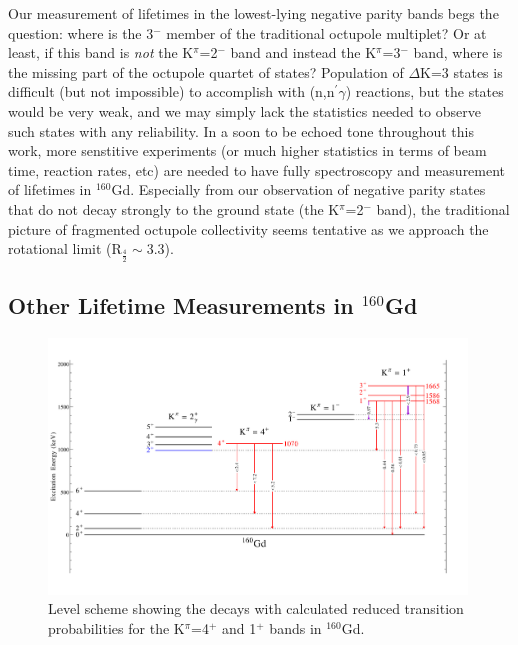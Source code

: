 Our measurement of lifetimes in the lowest-lying negative parity bands begs the question: where is the 3$^-$ member of the traditional octupole multiplet? Or at least, if this band is \textit{not} the K$^\pi$=2$^-$ band and instead the K$^\pi$=3$^-$ band, where is the missing part of the octupole quartet of states? Population of $\Delta$K=3 states is difficult (but not impossible) to accomplish with (n,n$^\prime\gamma$) reactions, but the states would be very weak, and we may simply lack the statistics needed to observe such states with any reliability. In a soon to be echoed tone throughout this work, more senstitive experiments (or much higher statistics in terms of beam time, reaction rates, etc) are needed to have fully spectroscopy and measurement of lifetimes in $^{160}$Gd. Especially from our observation of negative parity states that do not decay strongly to the ground state (the K$^\pi$=2$^-$ band), the traditional picture of fragmented octupole collectivity seems tentative as we approach the rotational limit (R$_{\frac{4}{2}}\sim$3.3).
\subsection{Other Lifetime Measurements in $^{160}$Gd}


\begin{center}
\begin{figure}[h!]
\includegraphics[width=0.99\textwidth]{160Gd_posparity.pdf}
\caption{Level scheme showing the decays with calculated reduced transition probabilities for the K$^\pi$=4$^+$ and 1$^+$ bands in $^{160}$Gd. \label{fig:160Gd_posparity}}
\end{figure}
\end{center}


